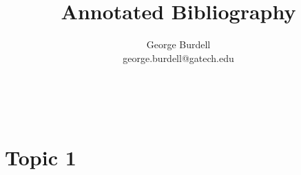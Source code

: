 \documentclass[12pt,letterpaper]{article}
\makeatletter
\renewcommand{\maketitle}{\bgroup
    \begin{center}
        \textbf{{\fontsize{18pt}{20}\selectfont \@title}}\\
        \vspace{10pt}
        {\fontsize{12pt}{0}\selectfont \@author}
    \end{center}
}
\makeatother
\begin{document}
    \title{Annotated Bibliography}
    \author{George Burdell \\ george.burdell@gatech.edu}

    \maketitle
    \thispagestyle{fancy}

    \section*{Topic 1}

    \subsection*{}
    \lipsum[1]

    \subsection*{}
    \lipsum[1]

    
\end{document}
